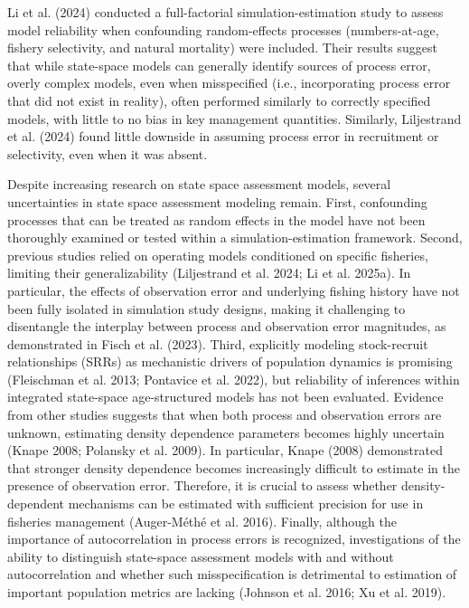 \documentclass[
  12pt,
]{article}
\begin{document}
Li et al. (2024) conducted a full-factorial simulation-estimation study
to assess model reliability when confounding random-effects processes
(numbers-at-age, fishery selectivity, and natural mortality) were
included. Their results suggest that while state-space models can
generally identify sources of process error, overly complex models, even
when misspecified (i.e., incorporating process error that did not exist
in reality), often performed similarly to correctly specified models,
with little to no bias in key management quantities. Similarly,
Liljestrand et al. (2024) found little downside in assuming process
error in recruitment or selectivity, even when it was absent.

Despite increasing research on state space assessment models, several
uncertainties in state space assessment modeling remain. First,
confounding processes that can be treated as random effects in the model
have not been thoroughly examined or tested within a
simulation-estimation framework. Second, previous studies relied on
operating models conditioned on specific fisheries, limiting their
generalizability (Liljestrand et al. 2024; Li et al. 2025a). In
particular, the effects of observation error and underlying fishing
history have not been fully isolated in simulation study designs, making
it challenging to disentangle the interplay between process and
observation error magnitudes, as demonstrated in Fisch et al. (2023).
Third, explicitly modeling stock-recruit relationships (SRRs) as
mechanistic drivers of population dynamics is promising (Fleischman et
al. 2013; Pontavice et al. 2022), but reliability of inferences within
integrated state-space age-structured models has not been evaluated.
Evidence from other studies suggests that when both process and
observation errors are unknown, estimating density dependence parameters
becomes highly uncertain (Knape 2008; Polansky et al. 2009). In
particular, Knape (2008) demonstrated that stronger density dependence
becomes increasingly difficult to estimate in the presence of
observation error. Therefore, it is crucial to assess whether
density-dependent mechanisms can be estimated with sufficient precision
for use in fisheries management (Auger-Méthé et al. 2016). Finally,
although the importance of autocorrelation in process errors is
recognized, investigations of the ability to distinguish state-space
assessment models with and without autocorrelation and whether such
misspecification is detrimental to estimation of important population
metrics are lacking (Johnson et al. 2016; Xu et al. 2019).
\end{document}
